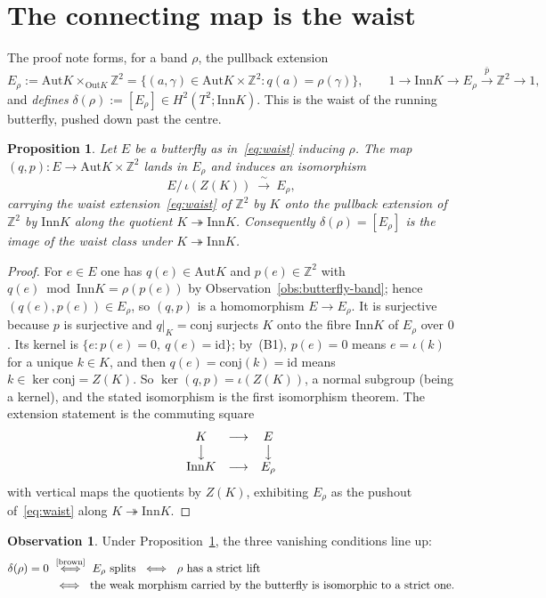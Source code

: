 \documentclass[11pt]{article}
\newtheorem{proposition}[theorem]{Proposition}
\theoremstyle{definition}
\newtheorem{observation}[theorem]{Observation}
\newcommand{\id}{\mathrm{id}}
\newcommand{\Z}{\mathbb{Z}}
\newcommand{\Aut}{\mathrm{Aut}}
\newcommand{\Inn}{\mathrm{Inn}}
\newcommand{\Out}{\mathrm{Out}}
\newcommand{\conj}{\mathrm{conj}}
\begin{document}
\section{The connecting map is the waist}\label{sec:connecting}

The proof note \cite{capstone} forms, for a band $\rho$, the pullback extension
\[
E_\rho:=\Aut K\times_{\Out K}\Z^2=\{(a,\gamma)\in\Aut K\times\Z^2:q(a)=\rho(\gamma)\},
\qquad 1\to\Inn K\to E_\rho\xrightarrow{\ \bar p\ }\Z^2\to1,
\]
and \emph{defines} $\delta(\rho):=[E_\rho]\in H^2(T^2;\Inn K)$. This is the waist of the running
butterfly, pushed down past the centre.

\begin{proposition}\label{prop:waist-is-Erho}
Let $E$ be a butterfly as in~\eqref{eq:waist} inducing $\rho$. The map
$(q,p)\colon E\to\Aut K\times\Z^2$ lands in $E_\rho$ and induces an isomorphism
\[
E/\,\iota(Z(K))\ \xrightarrow{\ \sim\ }\ E_\rho,
\]
carrying the waist extension~\eqref{eq:waist} of $\Z^2$ by $K$ onto the pullback extension of
$\Z^2$ by $\Inn K$ along the quotient $K\twoheadrightarrow\Inn K$. Consequently
$\delta(\rho)=[E_\rho]$ is the image of the waist class under $K\twoheadrightarrow\Inn K$.
\end{proposition}

\begin{proof}
For $e\in E$ one has $q(e)\in\Aut K$ and $p(e)\in\Z^2$ with
$q(e)\bmod\Inn K=\rho(p(e))$ by Observation~\ref{obs:butterfly-band}; hence
$(q(e),p(e))\in E_\rho$, so $(q,p)$ is a homomorphism $E\to E_\rho$. It is surjective because $p$ is
surjective and $q|_K=\conj$ surjects $K$ onto the fibre $\Inn K$ of $E_\rho$ over $0$. Its kernel is
$\{e:p(e)=0,\ q(e)=\id\}$; by~(B1), $p(e)=0$ means $e=\iota(k)$ for a unique $k\in K$, and then
$q(e)=\conj(k)=\id$ means $k\in\ker\conj=Z(K)$. So $\ker(q,p)=\iota(Z(K))$, a normal subgroup
(being a kernel), and the stated isomorphism is the first isomorphism theorem. The extension statement is the commuting square
\[
\begin{array}{ccc}
K & \longrightarrow & E\\
\big\downarrow && \big\downarrow\\
\Inn K & \longrightarrow & E_\rho
\end{array}
\]
with vertical maps the quotients by $Z(K)$, exhibiting $E_\rho$ as the pushout of~\eqref{eq:waist}
along $K\twoheadrightarrow\Inn K$.
\end{proof}

\begin{observation}\label{obs:split-dictionary}
Under Proposition~\ref{prop:waist-is-Erho}, the three vanishing conditions line up:
\[
\begin{aligned}
\delta(\rho)=0
\ &\overset{\text{\cite[IV.3]{brown}}}{\iff}\ E_\rho\text{ splits}
\ \iff\ \rho\text{ has a strict lift}\\
&\iff\ \text{the weak morphism carried by the butterfly is isomorphic to a strict one}.
\end{aligned}
\]
\end{observation}
\end{document}

